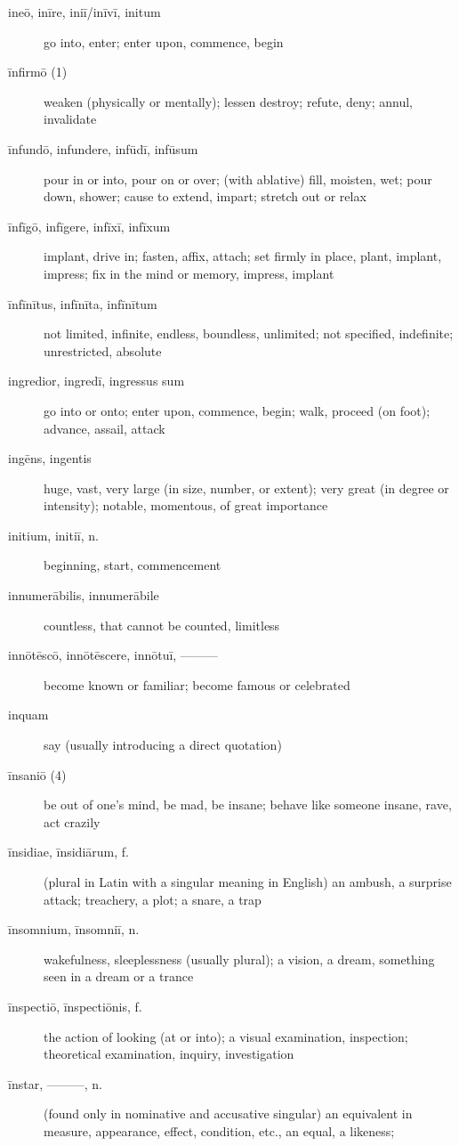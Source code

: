 \begin{description}
    \item[ineō, inīre, iniī/inīvī, initum] go into, enter; enter upon, commence, begin
    \item[īnfirmō (1)] weaken (physically or mentally); lessen destroy; refute, deny; annul, invalidate
    \item[īnfundō, infundere, infūdī, infūsum] pour in or into, pour on or over; (with ablative) fill, moisten, wet; pour down, shower; cause to extend, impart; stretch out or relax
    \item[īnfīgō, infīgere, infīxī, infīxum] implant, drive in; fasten, affix, attach; set firmly in place, plant, implant, impress; fix in the mind or memory, impress, implant
    \item[īnfīnītus, infīnīta, infīnītum] not limited, infinite, endless, boundless, unlimited; not specified, indefinite; unrestricted, absolute
    \item[ingredior, ingredī, ingressus sum] go into or onto; enter upon, commence, begin; walk, proceed (on foot); advance, assail, attack
    \item[ingēns, ingentis] huge, vast, very large (in size, number, or extent); very great (in degree or intensity); notable, momentous, of great importance
    \item[initium, initiī, n.] beginning, start, commencement
    \item[innumerābilis, innumerābile] countless, that cannot be counted, limitless
    \item[innōtēscō, innōtēscere, innōtuī, ———] become known or familiar; become famous or celebrated
    \item[inquam] say (usually introducing a direct quotation)
    \item[īnsaniō (4)] be out of one's mind, be mad, be insane; behave like someone insane, rave, act crazily
    \item[īnsidiae, īnsidiārum, f.] (plural in Latin with a singular meaning in English) an ambush, a surprise attack; treachery, a plot; a snare, a trap
    \item[īnsomnium, īnsomniī, n.] wakefulness, sleeplessness (usually plural); a vision, a dream, something seen in a dream or a trance
    \item[īnspectiō, īnspectiōnis, f.] the action of looking (at or into); a visual examination, inspection; theoretical examination, inquiry, investigation
    \item[īnstar, ———, n.] (found only in nominative and accusative singular) an equivalent in measure, appearance, effect, condition, etc., an equal, a likeness;

\end{description}
